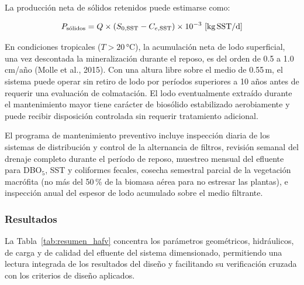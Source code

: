 \documentclass[12pt,a4paper]{article}
\begin{document}
La producción neta de sólidos retenidos puede estimarse como:

\begin{equation}
P_\text{sólidos} = Q \times (S_{0,\text{SST}} - C_{e,\text{SST}}) \times 10^{-3}\ \text{[kg\,SST/d]}
\end{equation}

En condiciones tropicales ($T > 20$\,°C), la acumulación neta de lodo superficial, una vez descontada la mineralización durante el reposo, es del orden de 0.5 a 1.0\,cm/año (Molle et al., 2015). Con una altura libre sobre el medio de 0.55\,m, el sistema puede operar sin retiro de lodo por períodos superiores a 10 años antes de requerir una evaluación de colmatación. El lodo eventualmente extraído durante el mantenimiento mayor tiene carácter de biosólido estabilizado aerobiamente y puede recibir disposición controlada sin requerir tratamiento adicional.

El programa de mantenimiento preventivo incluye inspección diaria de los sistemas de distribución y control de la alternancia de filtros, revisión semanal del drenaje completo durante el período de reposo, muestreo mensual del efluente para DBO$_5$, SST y coliformes fecales, cosecha semestral parcial de la vegetación macrófita (no más del 50\,\% de la biomasa aérea para no estresar las plantas), e inspección anual del espesor de lodo acumulado sobre el medio filtrante.


\subsubsection{Resultados}

La Tabla~\ref{tab:resumen_hafv} concentra los parámetros geométricos, hidráulicos, de carga y de calidad del efluente del sistema dimensionado, permitiendo una lectura integrada de los resultados del diseño y facilitando su verificación cruzada con los criterios de diseño aplicados.
\end{document}
